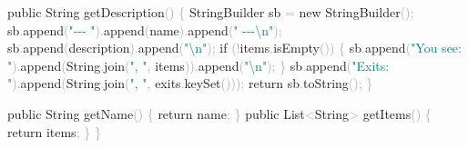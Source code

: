 \documentclass[
  justified,
  openright,
]{tufte-book}
\newcommand{\BuiltInTok}[1]{#1}
\newcommand{\ControlFlowTok}[1]{\textcolor{BrandBlue}{#1}}
\newcommand{\FunctionTok}[1]{\textcolor{BrandBlue}{#1}}
\newcommand{\KeywordTok}[1]{\textcolor{BrandBlue}{#1}}
\newcommand{\NormalTok}[1]{#1}
\newcommand{\OperatorTok}[1]{\textcolor{DarkGray}{#1}}
\newcommand{\SpecialCharTok}[1]{\textcolor{Teal}{#1}}
\newcommand{\StringTok}[1]{\textcolor{Teal}{#1}}
\newenvironment{Shaded}{%
  \begin{snugshade}
}{%
  \end{snugshade}
}
\begin{document}
\begin{Shaded}
\begin{Highlighting}[]
    \KeywordTok{public} \BuiltInTok{String} \FunctionTok{getDescription}\OperatorTok{()} \OperatorTok{\{}
        \BuiltInTok{StringBuilder}\NormalTok{ sb }\OperatorTok{=} \KeywordTok{new} \BuiltInTok{StringBuilder}\OperatorTok{();}
\NormalTok{        sb}\OperatorTok{.}\FunctionTok{append}\OperatorTok{(}\StringTok{"{-}{-}{-} "}\OperatorTok{).}\FunctionTok{append}\OperatorTok{(}\NormalTok{name}\OperatorTok{).}\FunctionTok{append}\OperatorTok{(}\StringTok{" {-}{-}{-}}\SpecialCharTok{\textbackslash{}n}\StringTok{"}\OperatorTok{);}
\NormalTok{        sb}\OperatorTok{.}\FunctionTok{append}\OperatorTok{(}\NormalTok{description}\OperatorTok{).}\FunctionTok{append}\OperatorTok{(}\StringTok{"}\SpecialCharTok{\textbackslash{}n}\StringTok{"}\OperatorTok{);}
        \ControlFlowTok{if} \OperatorTok{(!}\NormalTok{items}\OperatorTok{.}\FunctionTok{isEmpty}\OperatorTok{())} \OperatorTok{\{}
\NormalTok{            sb}\OperatorTok{.}\FunctionTok{append}\OperatorTok{(}\StringTok{"You see: "}\OperatorTok{).}\FunctionTok{append}\OperatorTok{(}\BuiltInTok{String}\OperatorTok{.}\FunctionTok{join}\OperatorTok{(}\StringTok{", "}\OperatorTok{,}\NormalTok{ items}\OperatorTok{)).}\FunctionTok{append}\OperatorTok{(}\StringTok{"}\SpecialCharTok{\textbackslash{}n}\StringTok{"}\OperatorTok{);}
        \OperatorTok{\}}
\NormalTok{        sb}\OperatorTok{.}\FunctionTok{append}\OperatorTok{(}\StringTok{"Exits: "}\OperatorTok{).}\FunctionTok{append}\OperatorTok{(}\BuiltInTok{String}\OperatorTok{.}\FunctionTok{join}\OperatorTok{(}\StringTok{", "}\OperatorTok{,}\NormalTok{ exits}\OperatorTok{.}\FunctionTok{keySet}\OperatorTok{()));}
        \ControlFlowTok{return}\NormalTok{ sb}\OperatorTok{.}\FunctionTok{toString}\OperatorTok{();}
    \OperatorTok{\}}

    \KeywordTok{public} \BuiltInTok{String} \FunctionTok{getName}\OperatorTok{()} \OperatorTok{\{} \ControlFlowTok{return}\NormalTok{ name}\OperatorTok{;} \OperatorTok{\}}
    \KeywordTok{public} \BuiltInTok{List}\OperatorTok{\textless{}}\BuiltInTok{String}\OperatorTok{\textgreater{}} \FunctionTok{getItems}\OperatorTok{()} \OperatorTok{\{} \ControlFlowTok{return}\NormalTok{ items}\OperatorTok{;} \OperatorTok{\}}
\OperatorTok{\}}
\end{Highlighting}
\end{Shaded}
\end{document}
